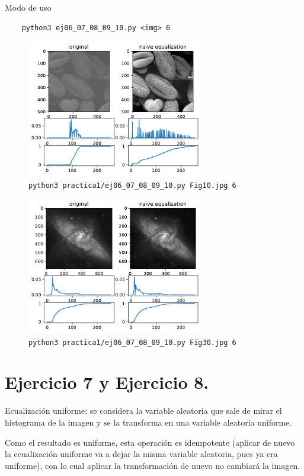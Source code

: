 \documentclass[11pt, spanish]{article}
\begin{document}
Modo de uso
\begin{verbatim}
    python3 ej06_07_08_09_10.py <img> 6
\end{verbatim}

\begin{figure}[H]
\centering
  \includegraphics[height=6cm]{informe-imgs/ej06-1.pdf}
  \caption{\texttt{python3 practica1/ej06\_07\_08\_09\_10.py Fig10.jpg 6}}
\end{figure}

\begin{figure}[H]
\centering
  \includegraphics[height=6cm]{informe-imgs/ej06-2.pdf}
  \caption{\texttt{python3 practica1/ej06\_07\_08\_09\_10.py Fig30.jpg 6}}
\end{figure}


\section{Ejercicio 7 y Ejercicio 8.}
Ecualización uniforme: se considera la variable aleatoria que sale de mirar el histograma de la imagen y se la
transforma en una variable aleatoria uniforme. 

Como el resultado es uniforme, esta operación es idempotente
(aplicar de nuevo la ecualización uniforme va a dejar la misma variable aleatoria,
pues ya era uniforme),
con lo cual aplicar la transformación de nuevo no cambiará la imagen.
\end{document}
